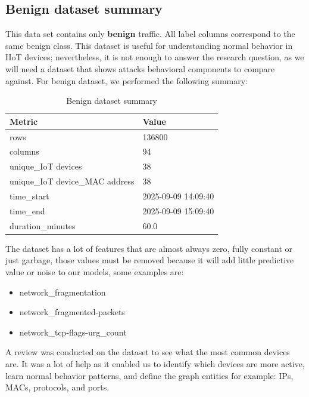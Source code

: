 \documentclass[final,5p,times,twocolumn]{elsarticle}
\begin{document}
\subsection{Benign dataset summary}
This data set contains only \textbf{benign} traffic. All label columns correspond to the same benign class. This dataset is useful for understanding normal behavior in IIoT devices; nevertheless, it is not enough to answer the research question, as we will need a dataset that shows attacks behavioral components to compare against.
For benign dataset, we performed the following summary:
\begin{table}[H]
\caption{Benign dataset summary}
\centering
\begin{tabular}{ll}
\hline
\textbf{Metric} & \textbf{Value} \\ \hline
rows & 136800 \\
columns & 94 \\
unique\_IoT devices & 38 \\
unique\_IoT device\_MAC address & 38 \\
time\_start & 2025-09-09 14:09:40 \\
time\_end & 2025-09-09 15:09:40 \\
duration\_minutes & 60.0 \\ \hline
\end{tabular}
\label{tab:dataset_summary}
\end{table}

The dataset has a lot of features that are almost always zero, fully constant or just garbage, those values must be removed because it will add little predictive value or noise to our models, some examples are:
\begin{itemize}
    \item network\_fragmentation
    \item network\_fragmented-packets
    \item network\_tcp-flags-urg\_count
\end{itemize}

A review was conducted on the dataset to see what the most common devices are. It was a lot of help as it enabled us to identify which devices are more active, learn normal behavior patterns, and define the graph entities for example: IPs, MACs, protocols, and ports. 
\end{document}
